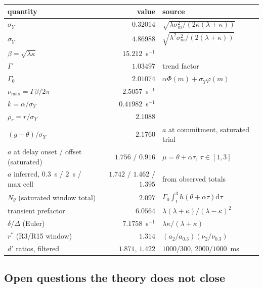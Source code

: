 \documentclass[11pt,a4paper]{article}
\newcommand{\dd}{\mathrm{d}}
\theoremstyle{plain}
\theoremstyle{remark}
\begin{document}
\begin{center}
\begin{tabular}{lrl}
\toprule
quantity & value & source\\
\midrule
$\sigma_Y$ & $0.32014$ & $\sqrt{\lambda\sigma_m^2/(2\kappa(\lambda+\kappa))}$\\
$\sigma_{\dot Y}$ & $4.86988$ & $\sqrt{\lambda^2\sigma_m^2/(2(\lambda+\kappa))}$\\
$\beta=\sqrt{\lambda\kappa}$ & $15.212$~s$^{-1}$ & \\
$\Gamma$ & $1.03497$ & trend factor\\
$\Gamma_0$ & $2.01074$ & $\alpha\Phi(m)+\sigma_{\dot Y}\varphi(m)$\\
$\nu_{\max}=\Gamma\beta/2\pi$ & $2.5057$~s$^{-1}$ & \\
$k=\alpha/\sigma_Y$ & $0.41982$~s$^{-1}$ & \\
$\rho_r=r/\sigma_Y$ & $2.1088$ & \\
$(g-\theta)/\sigma_Y$ & $2.1760$ & $a$ at commitment, saturated trial\\
$a$ at delay onset / offset (saturated) & $1.756$ / $0.916$ & $\mu=\theta+\alpha\tau$, $\tau\in[1,3]$\\
$a$ inferred, $0.3$~s / $2$~s / max cell & $1.742$ / $1.462$ / $1.395$ & from observed totals\\
$N_\theta$ (saturated window total) & $2.097$ & $\Gamma_0\int_1^3h(\theta+\alpha\tau)\dd\tau$\\
transient prefactor & $6.0564$ & $\lambda(\lambda+\kappa)/(\lambda-\kappa)^2$\\
$\delta/\Delta$ (Euler) & $7.1758$~s$^{-1}$ & $\lambda\kappa/(\lambda+\kappa)$\\
$r^{*}$ (R3/R15 window) & $1.314$ & $(a_2/a_{0.3})(\nu_2/\nu_{0.3})$\\
$d'$ ratios, filtered & $1.871$, $1.422$ & $1000/300$, $2000/1000$~ms\\
\bottomrule
\end{tabular}
\end{center}

\subsection{Open questions the theory does not close}
\end{document}

